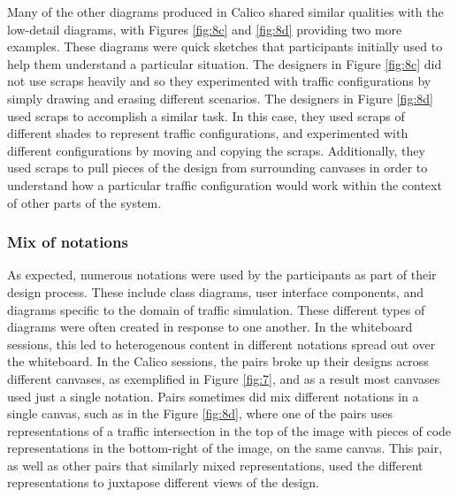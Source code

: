 Many of the other diagrams produced in Calico shared similar qualities with the low-detail diagrams, with Figures \ref{fig:8c} and \ref{fig:8d} providing two more examples. These diagrams were quick sketches that participants initially used to help them understand a particular situation. The designers in Figure \ref{fig:8c} did not use scraps heavily and so they experimented with traffic configurations by simply drawing and erasing different scenarios. The designers in Figure \ref{fig:8d} used scraps to accomplish a similar task. In this case, they used scraps of different shades to represent traffic configurations, and experimented with different configurations by moving and copying the scraps. Additionally, they used scraps to pull pieces of the design from surrounding canvases in order to understand how a particular traffic configuration would work within the context of other parts of the system. 

\subsubsection {Mix of notations}
\label{results:23}

As expected, numerous notations were used by the participants as part of their design process. These include class diagrams, user interface components, and diagrams specific to the domain of traffic simulation. These different types of diagrams were often created in response to one another. In the whiteboard sessions, this led to heterogenous content in different notations spread out over the whiteboard. In the Calico sessions, the pairs broke up their designs across different canvases, as exemplified in Figure \ref{fig:7}, and as a result most canvases used just a single notation. Pairs sometimes did mix different notations in a single canvas, such as in the Figure \ref{fig:8d}, where one of the pairs uses representations of a traffic intersection in the top of the image with pieces of code representations in the bottom-right of the image, on the same canvas. This pair, as well as other pairs that similarly mixed representations, used the different representations to juxtapose different views of the design.

